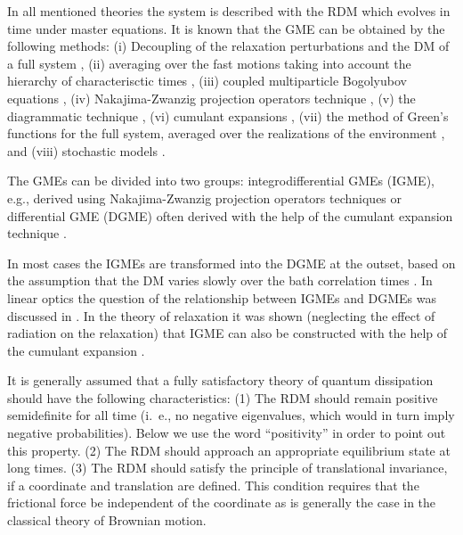 \documentclass[12pt,twoside,a4paper]{report}
\begin{document}
In all mentioned theories the system is described with the RDM
which evolves in time under master equations.
It is known that the GME can be obtained by 
the following methods:
(i)    Decoupling of the relaxation perturbations and the DM 
       of a full system
       \cite{szik69,sche84,hana83A},
(ii)   averaging over the fast motions 
       taking into account the hierarchy of characterisctic times 
       \cite{hana83A,hana83B,hana83C},
(iii)  coupled multiparticle Bogolyubov equations \cite{nien81},
(iv)   Nakajima-Zwanzig projection operators technique \cite{hana83D,burn82},
(v)    the diagrammatic technique \cite{zaid81},
(vi)   cumulant expansions \cite{yama86,muka78},
(vii)  the method of Green's functions for the full system, 
       averaged over the
       realizations of the environment \cite{kili86}, and
(viii) stochastic models 
       \cite{berm85,agar85}.


The GMEs can be divided into two groups:
integrodifferential GMEs (IGME),  
e.g., \cite{argy64,nien81,burn82,agar85}
derived using Nakajima-Zwanzig projection operators techniques 
\cite{zwan61}
or  differential GME (DGME)
\cite{zaid81,yama86,muka78}
often derived with the help of the cumulant expansion technique
\cite{kubo54,kamp92,free68,y5}.

In most cases the 
IGMEs
are transformed into
the DGME
at the outset, based on the assumption that
the DM varies slowly over  the bath correlation times
\cite{sche84,hana83A,hana83B,hana83C,hana83D,agar85}.
In linear optics the question of the relationship between
IGMEs and DGMEs
was discussed in
\cite{muka79,saek83}.
In the theory of relaxation
it was shown
(neglecting the effect of radiation on the relaxation)
that IGME
can also be constructed with the help of the cumulant expansion
\cite{yoon75}.


It is generally assumed \cite{lind76A,kohe97}
that a fully satisfactory theory 
of quantum dissipation should have the following characteristics:
(1) The RDM should remain positive semidefinite for all time
    (i.~e., no negative eigenvalues, 
    which would in turn imply negative probabilities).
    Below we use the word ``positivity'' 
    in order to point out this property.
(2) The RDM should approach 
    an appropriate equilibrium state at long times.
(3) The RDM should satisfy 
    the principle of translational invariance,
    if a coordinate and translation  are  defined.
    This condition requires that the frictional force be independent of the
    coordinate
    as is generally the case in the classical theory of Brownian motion.
\end{document}

